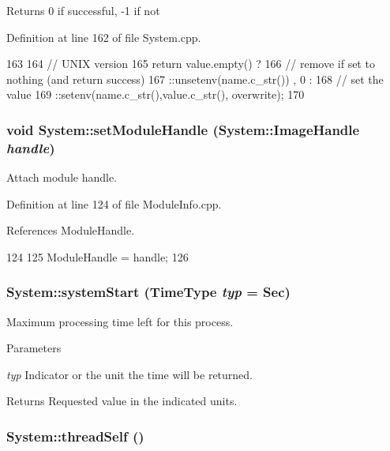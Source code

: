 \begin{DoxyReturn}{Returns}
0 if successful, -\/1 if not 
\end{DoxyReturn}


Definition at line 162 of file System.cpp.


\begin{DoxyCode}
163 {
164   // UNIX version
165   return value.empty() ?
166     // remove if set to nothing (and return success)
167     ::unsetenv(name.c_str()) , 0 :
168     // set the value
169     ::setenv(name.c_str(),value.c_str(), overwrite);
170 }
\end{DoxyCode}
\hypertarget{namespaceSystem_af2318f71452b7e844f0b654a8bd93018}{
\subsubsection[{setModuleHandle}]{\setlength{\rightskip}{0pt plus 5cm}void System::setModuleHandle ({\bf System::ImageHandle} {\em handle})}}
\label{namespaceSystem_af2318f71452b7e844f0b654a8bd93018}


Attach module handle. 

Definition at line 124 of file ModuleInfo.cpp.

References ModuleHandle.


\begin{DoxyCode}
124                                                         {
125   ModuleHandle = handle;
126 }
\end{DoxyCode}
\hypertarget{namespaceSystem_a1191eba9e2a1ac98985ec50e0820ab06}{
\subsubsection[{systemStart}]{ System::systemStart (TimeType {\em typ} = {\ttfamily Sec})}}
\label{namespaceSystem_a1191eba9e2a1ac98985ec50e0820ab06}
Maximum processing time left for this process. 
\begin{DoxyParams}{Parameters}
\item[{\em typ}]Indicator or the unit the time will be returned. \end{DoxyParams}
\begin{DoxyReturn}{Returns}
Requested value in the indicated units. 
\end{DoxyReturn}
\hypertarget{namespaceSystem_a44291b84679d3ed0cb8e9ffdc12b9d73}{
\subsubsection[{threadSelf}]{ System::threadSelf ()}}
\label{namespaceSystem_a44291b84679d3ed0cb8e9ffdc12b9d73}


